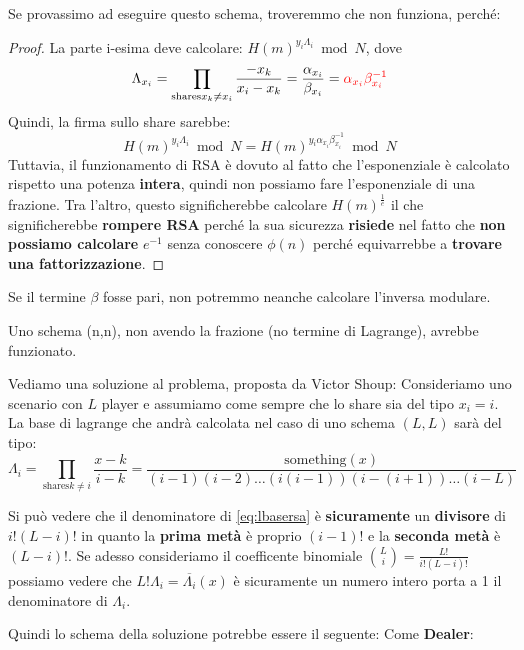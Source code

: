 Se provassimo ad eseguire questo schema, troveremmo che non funziona, perché:
\begin{proof}
La parte i-esima deve calcolare: $H(m)^{y_i\Lambda_i}\bmod{N}$, dove 
\[\Lambda_{x_i}=\prod_{\text{shares} x_k\ne x_i}\frac{-x_k}{x_i-x_k}=\frac{\alpha_{x_i}}{\beta_{x_i}}=\textcolor{red}{\alpha_{x_i}\beta_{x_i}^{-1}}\]
Quindi, la firma sullo share sarebbe:
\[H(m)^{y_i\Lambda_i}\bmod{N}=H(m)^{y_i\alpha_{x_i}\beta_{x_i}^{-1}}\bmod{N}\]
Tuttavia, il funzionamento di RSA è dovuto al fatto che l'esponenziale è calcolato rispetto una potenza \textbf{intera}, quindi non possiamo fare l'esponenziale di una frazione. Tra l'altro, questo significherebbe calcolare $H(m)^\frac{1}{e}$ il che significherebbe \textbf{rompere RSA} perché la sua sicurezza \textbf{risiede} nel fatto che \textbf{non possiamo calcolare} $e^{-1}$ senza conoscere $\phi(n)$ perché equivarrebbe a \textbf{trovare una fattorizzazione}.
\end{proof}
\begin{remark}
Se il termine $\beta$ fosse pari, non potremmo neanche calcolare l'inversa modulare.
\end{remark}
\begin{note}
Uno schema (n,n), non avendo la frazione (no termine di Lagrange), avrebbe funzionato.
\end{note}
Vediamo una soluzione al problema, proposta da Victor Shoup:
Consideriamo uno scenario con $L$ player e assumiamo come sempre che lo share sia del tipo $x_i=i$. La base di lagrange che andrà calcolata nel caso di uno schema $(L,L)$ sarà del tipo:
\begin{equation}\label{eq:lbasersa}
\Lambda_{i}=\prod_{\text{shares} k\ne i}\frac{x-k}{i-k}=\frac{\text{something}(x)}{(i-1)(i-2)\dots(i(i-1))(i-(i+1))\dots(i-L)}
\end{equation}
\begin{remark}
Si può vedere che il denominatore di \cref{eq:lbasersa} è \textbf{sicuramente} un \textbf{divisore} di $i!(L-i)!$ in quanto la \textbf{prima metà} è proprio $(i-1)!$ e la \textbf{seconda metà} è $(L-i)!$. Se adesso consideriamo il coefficente binomiale $\binom{L}{i}=\frac{L!}{i!(L-i)!}$ possiamo vedere che $L!\Lambda_i=\overline{\Lambda_i}(x)$ è sicuramente un numero intero porta a 1 il denominatore di $\Lambda_i$.
\end{remark}
Quindi lo schema della soluzione potrebbe essere il seguente:
Come \textbf{Dealer}:
